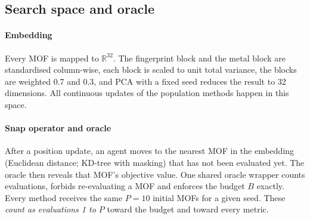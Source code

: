 \subsection{Search space and oracle}
\label{sec:oracle}
\paragraph{Embedding}
Every MOF is mapped to $\mathbb{R}^{32}$. The fingerprint block and the metal block are standardised column-wise, each block is scaled to unit total variance, the blocks are weighted 0.7 and 0.3, and PCA with a fixed seed reduces the result to 32 dimensions. All continuous updates of the population methods happen in this space.

\paragraph{Snap operator and oracle}
After a position update, an agent moves to the nearest MOF in the embedding (Euclidean distance; KD-tree with masking) that has not been evaluated yet. The oracle then reveals that MOF's objective value. One shared oracle wrapper counts evaluations, forbids re-evaluating a MOF and enforces the budget $B$ exactly. Every method receives the same $P=10$ initial MOFs for a given seed. These \emph{count as evaluations 1 to $P$} toward the budget and toward every metric.

